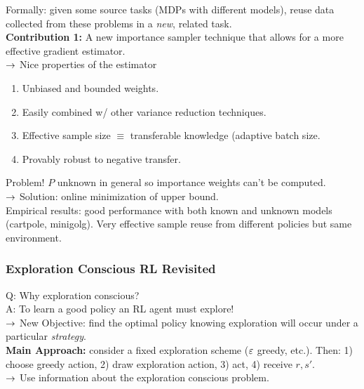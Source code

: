 Formally: given some source tasks (MDPs with different models), reuse data collected from these problems in a {\it new}, related task. \\

{\bf Contribution 1:} A new importance sampler technique that allows for a more effective gradient estimator. \\

$\rightarrow$ Nice properties of the estimator
\begin{enumerate}
    \item Unbiased and bounded weights.
    \item Easily combined w/ other variance reduction techniques.
    \item Effective sample size $\equiv$ transferable knowledge (adaptive batch size.
    \item Provably robust to negative transfer.
\end{enumerate}

Problem! $P$ unknown in general so importance weights can't be computed. \\

$\rightarrow$ Solution: online minimization of upper bound. \\

Empirical results: good performance with both known and unknown models (cartpole, minigolg). Very effective sample reuse from different policies but same environment. \\

\spacerule

\subsubsection{Exploration Conscious RL Revisited}

Q: Why exploration conscious? \\

A: To learn a good policy an RL agent must explore! \\

$\rightarrow$ New Objective: find the optimal policy knowing exploration will occur under a particular {\it strategy}. \\

{\bf Main Approach:} consider a fixed exploration scheme ($\varepsilon$ greedy, etc.). Then: 1) choose greedy action, 2) draw exploration action, 3) act, 4) receive $r, s'$. \\

$\rightarrow$ Use information about the exploration conscious problem. \\

